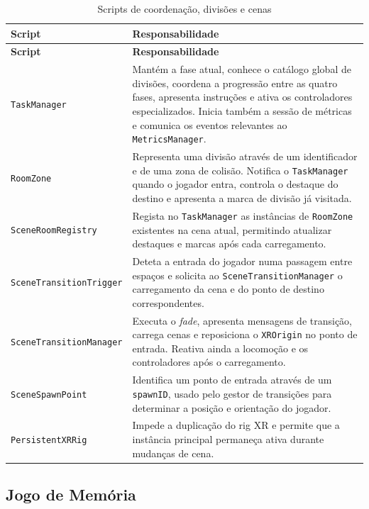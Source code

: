 \documentclass[12pt,a4paper,oneside]{report}
\begin{document}
\begin{longtable}{p{4.2cm}p{8.5cm}}
\caption{Scripts de coordenação, divisões e cenas}
\label{tab:scripts-coordenacao}\\
\toprule
\textbf{Script} & \textbf{Responsabilidade} \\
\midrule
\endfirsthead
\toprule
\textbf{Script} & \textbf{Responsabilidade} \\
\midrule
\endhead
\texttt{TaskManager} &
Mantém a fase atual, conhece o catálogo global de divisões, coordena a progressão entre as quatro fases, apresenta instruções e ativa os controladores especializados. Inicia também a sessão de métricas e comunica os eventos relevantes ao \texttt{MetricsManager}. \\

\texttt{RoomZone} &
Representa uma divisão através de um identificador e de uma zona de colisão. Notifica o \texttt{TaskManager} quando o jogador entra, controla o destaque do destino e apresenta a marca de divisão já visitada. \\

\texttt{SceneRoomRegistry} &
Regista no \texttt{TaskManager} as instâncias de \texttt{RoomZone} existentes na cena atual, permitindo atualizar destaques e marcas após cada carregamento. \\

\texttt{SceneTransitionTrigger} &
Deteta a entrada do jogador numa passagem entre espaços e solicita ao \texttt{SceneTransitionManager} o carregamento da cena e do ponto de destino correspondentes. \\

\texttt{SceneTransitionManager} &
Executa o \textit{fade}, apresenta mensagens de transição, carrega cenas e reposiciona o \texttt{XROrigin} no ponto de entrada. Reativa ainda a locomoção e os controladores após o carregamento. \\

\texttt{SceneSpawnPoint} &
Identifica um ponto de entrada através de um \texttt{spawnID}, usado pelo gestor de transições para determinar a posição e orientação do jogador. \\

\texttt{PersistentXRRig} &
Impede a duplicação do rig \ac{XR} e permite que a instância principal permaneça ativa durante mudanças de cena. \\
\bottomrule
\end{longtable}

\subsection{Jogo de Memória}
\end{document}
